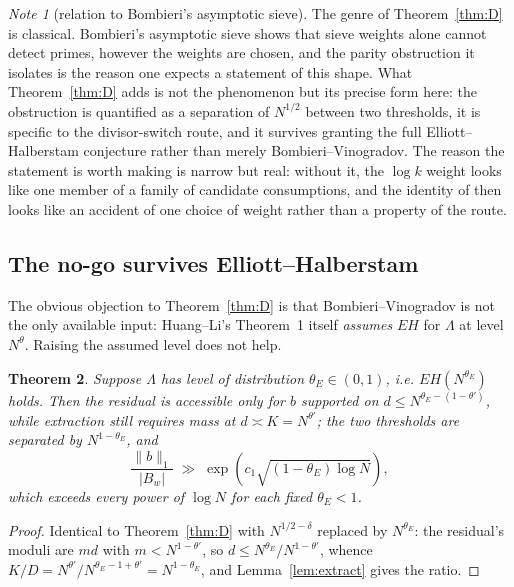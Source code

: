 \documentclass[11pt,a4paper]{article}
\theoremstyle{plain}
\newtheorem{theorem}{Theorem}
\theoremstyle{definition}
\theoremstyle{remark}
\newtheorem{note}[theorem]{Note}
\begin{document}
\begin{note}[relation to Bombieri's asymptotic sieve]\label{note:bombieri}
The genre of Theorem~\ref{thm:D} is classical. Bombieri's asymptotic
sieve \cite{Bom76} shows that sieve weights alone cannot detect
primes, however the weights are chosen, and the parity obstruction it
isolates is the reason one expects a statement of this shape. What
Theorem~\ref{thm:D} adds is not the phenomenon but its precise form
here: the obstruction is quantified as a separation of $N^{1/2}$
between two thresholds, it is specific to the divisor-switch route,
and it survives granting the full Elliott--Halberstam conjecture
rather than merely Bombieri--Vinogradov. The reason the statement is
worth making is narrow but real: without it, the $\log k$ weight looks
like one member of a family of candidate consumptions, and the
identity of \cite[Thm.~3]{P1} then looks like an accident of one
choice of weight rather than a property of the route.
\end{note}

\subsection{The no-go survives Elliott--Halberstam}

The obvious objection to Theorem~\ref{thm:D} is that
Bombieri--Vinogradov is not the only available input: Huang--Li's
Theorem~1 itself \emph{assumes} $EH$ for $\Lambda$ at level
$N^{\theta}$. Raising the assumed level does not help.

\begin{theorem}\label{thm:Dprime}
Suppose $\Lambda$ has level of distribution $\theta_E\in(0,1)$, i.e.
$EH(N^{\theta_E})$ holds. Then the residual is accessible only for $b$
supported on $d\le N^{\theta_E-(1-\theta')}$, while extraction still
requires mass at $d\asymp K=N^{\theta'}$; the two thresholds are
separated by $N^{1-\theta_E}$, and
\[
  \frac{\|b\|_1}{|B_w|}\;\gg\;
  \exp\!\left(c_1\sqrt{(1-\theta_E)\log N}\right),
\]
which exceeds every power of $\log N$ for each fixed $\theta_E<1$.
\end{theorem}

\begin{proof}
Identical to Theorem~\ref{thm:D} with $N^{1/2-\delta}$ replaced by
$N^{\theta_E}$: the residual's moduli are $md$ with $m<N^{1-\theta'}$,
so $d\le N^{\theta_E}/N^{1-\theta'}$, whence
$K/D=N^{\theta'}/N^{\theta_E-1+\theta'}=N^{1-\theta_E}$, and
Lemma~\ref{lem:extract} gives the ratio.
\end{proof}
\end{document}
